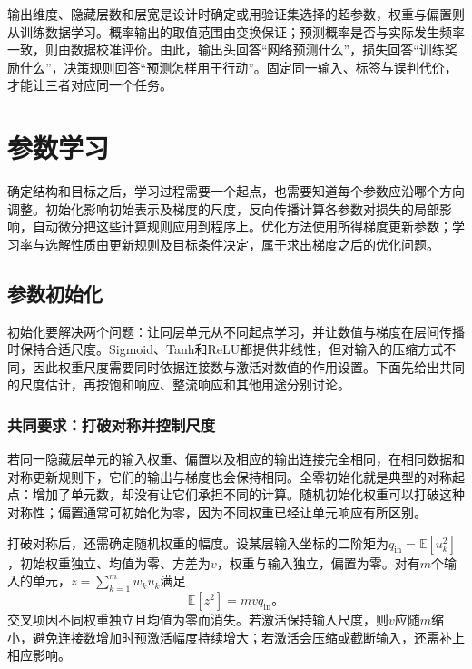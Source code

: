 输出维度、隐藏层数和层宽是设计时确定或用验证集选择的超参数，权重与偏置则从训练数据学习。概率输出的取值范围由变换保证；预测概率是否与实际发生频率一致，则由数据校准评价。由此，输出头回答“网络预测什么”，损失回答“训练奖励什么”，决策规则回答“预测怎样用于行动”。固定同一输入、标签与误判代价，才能让三者对应同一个任务。

\section{参数学习}
\label{sec:ffn-learning}

确定结构和目标之后，学习过程需要一个起点，也需要知道每个参数应沿哪个方向调整。初始化影响初始表示及梯度的尺度，反向传播计算各参数对损失的局部影响，自动微分把这些计算规则应用到程序上。优化方法使用所得梯度更新参数；学习率与选解性质由更新规则及目标条件决定，属于求出梯度之后的优化问题。

\subsection{参数初始化}
\label{sec:ffn-initialization}

初始化要解决两个问题：让同层单元从不同起点学习，并让数值与梯度在层间传播时保持合适尺度。Sigmoid、Tanh和ReLU都提供非线性，但对输入的压缩方式不同，因此权重尺度需要同时依据连接数与激活对数值的作用设置。下面先给出共同的尺度估计，再按饱和响应、整流响应和其他用途分别讨论。

\subsubsection{共同要求：打破对称并控制尺度}
\label{sec:ffn-initialization-common}

若同一隐藏层单元的输入权重、偏置以及相应的输出连接完全相同，在相同数据和对称更新规则下，它们的输出与梯度也会保持相同。全零初始化就是典型的对称起点：增加了单元数，却没有让它们承担不同的计算。随机初始化权重可以打破这种对称性；偏置通常可初始化为零，因为不同权重已经让单元响应有所区别。

打破对称后，还需确定随机权重的幅度。设某层输入坐标的二阶矩为$q_{\mathrm{in}}=\mathbb{E}[u_k^2]$，初始权重独立、均值为零、方差为$v$，权重与输入独立，偏置为零。对有$m$个输入的单元，$z=\sum_{k=1}^{m}w_k u_k$满足
\begin{equation}
  \mathbb{E}[z^2]=m v q_{\mathrm{in}}\text{。}
  \label{eq:ffn-initial-signal-scale}
\end{equation}
交叉项因不同权重独立且均值为零而消失。若激活保持输入尺度，则$v$应随$m$缩小，避免连接数增加时预激活幅度持续增大；若激活会压缩或截断输入，还需补上相应影响。

